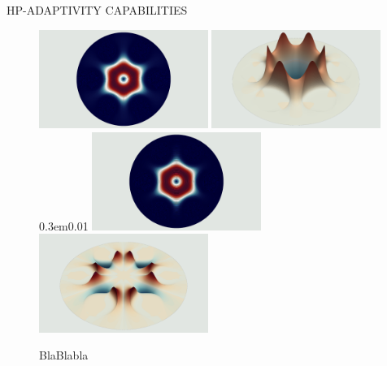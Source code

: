 \documentclass[final]{beamer} %
\def\vspace{0.3em}{ }%
\begin{document}
\begin{frame}
\begin{columns}
\begin{column}{0.45\textwidth}
{\begin{block}{\boxnumber HP-ADAPTIVITY CAPABILITIES }
    	\begin{figure}[hb]
	    	\begin{mdframed}[backgroundcolor=bggrey]
	            \includegraphics[width=0.49\textwidth]{images/et1posterHoley.png}%
	            \hspace{0.01\textwidth}%
	            \includegraphics[width=0.49\textwidth]{images/ez1posterHoley.png}
	            \vspace{0.01\textwidth}
	            \includegraphics[width=0.49\textwidth]{images/et2posterHoley.png}%
	            \hspace{0.01\textwidth}%
	            \includegraphics[width=0.49\textwidth]{images/ez2posterHoley.png}
	        \end{mdframed}
            \caption{BlaBlabla}
        \end{figure}
        \end{block}

        \vfill

      } %
    \end{column}

  \end{columns}
\end{frame}
\end{document}
